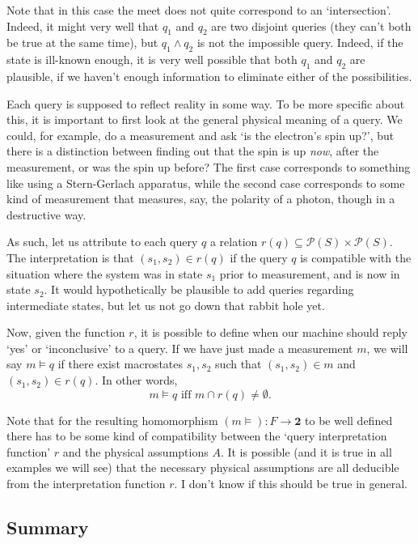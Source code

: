 \documentclass{article}
\theoremstyle{definition}
\theoremstyle{plain}
\newcommand{\ps}{\mathcal{P}}
\newcommand{\two}{\mathbf{2}}
\begin{document}
Note that in this case the meet does not quite correspond to an `intersection'. Indeed, it might very well that $q_1$ and $q_2$ are two disjoint queries (they can't both be true at the same time), but $q_1 \land q_2$ is not the impossible query. Indeed, if the state is ill-known enough, it is very well possible that both $q_1$ and $q_2$ are plausible, if we haven't enough information to eliminate either of the possibilities.

Each query is supposed to reflect reality in some way. To be more specific about this, it is important to first look at the general physical meaning of a query. We could, for example, do a measurement and ask `is the electron's spin up?', but there is a distinction between finding out that the spin is up \emph{now}, after the measurement, or was the spin up before? The first case corresponds to something like using a Stern-Gerlach apparatus, while the second case corresponds to some kind of measurement that measures, say, the polarity of a photon, though in a destructive way.

As such, let us attribute to each query $q$ a relation $r(q) \subseteq \ps(S) \times \ps(S)$. The interpretation is that $(s_1, s_2) \in r(q)$ if the query $q$ is compatible with the situation where the system was in state $s_1$ prior to measurement, and is now in state $s_2$. It would hypothetically be plausible to add queries regarding intermediate states, but let us not go down that rabbit hole yet.

Now, given the function $r$, it is possible to define when our machine should reply `yes' or `inconclusive' to a query. If we have just made a measurement $m$, we will say $m \vDash q$ if there exist macrostates $s_1, s_2$ such that $(s_1, s_2) \in m$ and $(s_1, s_2) \in r(q)$. In other words,
\begin{equation}\label{defvdash}
m \vDash q \text{ iff } m \cap r(q) \neq \emptyset.
\end{equation}

Note that for the resulting homomorphism $(m\vDash) : F \to \two$ to be well defined there has to be some kind of compatibility between the `query interpretation function' $r$ and the physical assumptions $A$. It is possible (and it is true in all examples we will see) that the necessary physical assumptions are all deducible from the interpretation function $r$. I don't know if this should be true in general.

\subsection{Summary}
\end{document}
